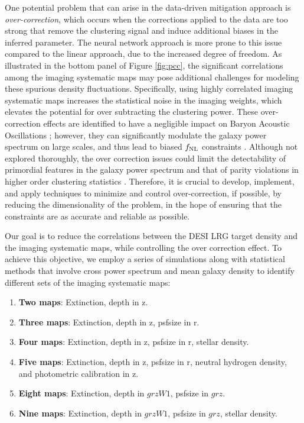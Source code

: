 One potential problem that can arise in the data-driven mitigation approach is \textit{over-correction}, which occurs when the corrections applied to the data are too strong that remove the clustering signal and induce additional biases in the inferred parameter. The neural network approach is more prone to this issue compared to the linear approach, due to the increased degree of freedom. As illustrated in the bottom panel of Figure \ref{fig:pcc}, the significant correlations among the imaging systematic maps may pose additional challenges for modeling these spurious density fluctuations. Specifically, using highly correlated imaging systematic maps increases the statistical noise in the imaging weights, which elevates the potential for over subtracting the clustering power. These over-correction effects are identified to have a negligible impact on Baryon Acoustic Oscillations \citep{merz2021clustering}; however, they can significantly modulate the galaxy power spectrum on large scales, and thus lead to biased $f_{\rm NL}$ constraints \citep{rezaie2021primordial, mueller2022primordial}. Although not explored thoroughly, the over correction issues could limit the detectability of primordial features in the galaxy power spectrum and that of parity violations in higher order clustering statistics \citep{beutler2019primordial, cahn2021test, philcox2022probing}. Therefore, it is crucial to develop, implement, and apply techniques to minimize and control over-correction, if possible, by reducing the dimensionality of the problem, in the hope of ensuring that the constraints are as accurate and reliable as possible. 

Our goal is to reduce the correlations between the DESI LRG target density and the imaging systematic maps, while controlling the over correction effect.  To achieve this objective, we employ a series of simulations along with statistical methods that involve cross power spectrum and mean galaxy density to identify different sets of the imaging systematic maps:
\begin{enumerate}[itemindent=*]
\item \textbf{Two maps}: Extinction, depth in z.
\item \textbf{Three maps}: Extinction, depth in z, psfsize in r.
\item \textbf{Four maps}: Extinction, depth in z, psfsize in r, stellar density.
\item \textbf{Five maps}: Extinction, depth in z, psfsize in r, neutral hydrogen density, and photometric calibration in z.
\item \textbf{Eight maps}: Extinction, depth in $grzW1$, psfsize in $grz$.
\item \textbf{Nine maps}: Extinction, depth in $grzW1$, psfsize in $grz$, stellar density.
\end{enumerate}

